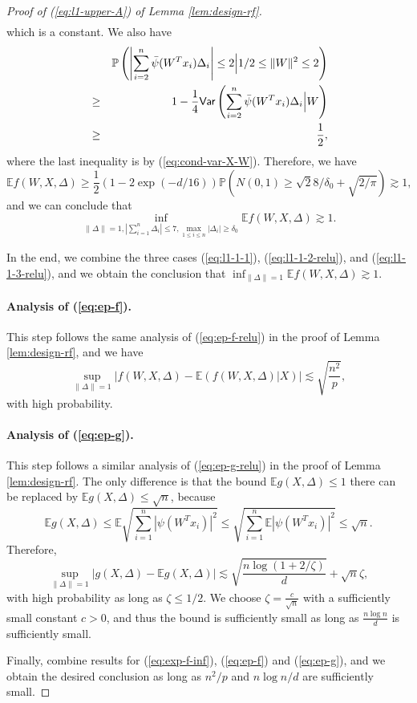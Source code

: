 \begin{proof}[Proof of (\ref{eq:l1-upper-A}) of Lemma \ref{lem:design-rf}]
\begin{eqnarray*}
\end{eqnarray*}
which is a constant. We also have
\begin{eqnarray*}
&& \mathbb{P}\left(\left|\sum_{i=2}^n\bar{\psi}(W^Tx_i)\Delta_i\right|\leq 2\Big|1/2\leq \|W\|^2\leq 2\right) \\
&\geq& 1 - \frac{1}{4}\Var\left(\sum_{i=2}^n\bar{\psi}(W^Tx_i)\Delta_i\Big|W\right) \\
&\geq& \frac{1}{2},
\end{eqnarray*}
where the last inequality is by (\ref{eq:cond-var-X-W}). Therefore, we have
$$\mathbb{E}f(W,X,\Delta)\geq \frac{1}{2}\left(1-2\exp(-d/16)\right)\mathbb{P}\left(N(0,1)\geq \sqrt{2}8/\delta_0 + \sqrt{2/\pi}\right)\gtrsim 1,$$
and we can conclude that
\begin{equation}
\inf_{\|\Delta\|=1,|\sum_{i=1}^n\Delta_i|\leq 7, \max_{1\leq i\leq n}|\Delta_i|\geq\delta_0}\mathbb{E}f(W,X,\Delta) \gtrsim 1.\label{eq:l1-1-3-relu}
\end{equation}

In the end, we combine the three cases (\ref{eq:l1-1-1}), (\ref{eq:l1-1-2-relu}), and (\ref{eq:l1-1-3-relu}),  and we obtain the conclusion that $\inf_{\|\Delta\|=1}\mathbb{E}f(W,X,\Delta)\gtrsim 1$.


\paragraph{Analysis of (\ref{eq:ep-f}).} This step follows the same analysis of (\ref{eq:ep-f-relu}) in the proof of Lemma \ref{lem:design-rf}, and we have
$$\sup_{\|\Delta\|=1}\left|f(W,X,\Delta)-\mathbb{E}(f(W,X,\Delta)|X)\right|\lesssim \sqrt{\frac{n^2}{p}},$$
with high probability.

\paragraph{Analysis of (\ref{eq:ep-g}).} This step follows a similar analysis of (\ref{eq:ep-g-relu}) in the proof of Lemma \ref{lem:design-rf}. The only difference is that the bound $\mathbb{E}g(X,\Delta)\leq 1$ there can be replaced by $\mathbb{E}g(X,\Delta)\leq \sqrt{n}$, because
$$\mathbb{E}g(X,\Delta)\leq \mathbb{E}\sqrt{\sum_{i=1}^n|\psi(W^Tx_i)|^2}\leq \sqrt{\sum_{i=1}^n\mathbb{E}|\psi(W^Tx_i)|^2}\leq \sqrt{n}.$$
Therefore,
$$\sup_{\|\Delta\|=1}|g(X,\Delta) - \mathbb{E}g(X,\Delta)|\lesssim \sqrt{\frac{n\log(1+2/\zeta)}{d}} + \sqrt{n}\zeta,$$
with high probability as long as $\zeta\leq 1/2$. We choose $\zeta=\frac{c}{\sqrt{n}}$ with a sufficiently small constant $c>0$, and thus the bound is sufficiently small as long as $\frac{n\log n}{d}$ is sufficiently small.

Finally, combine results for (\ref{eq:exp-f-inf}), (\ref{eq:ep-f}) and (\ref{eq:ep-g}), and we obtain the desired conclusion as long as $n^2/p$ and $n\log n/d$ are sufficiently small.
\end{proof}

